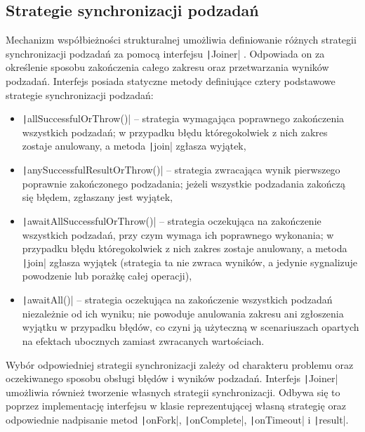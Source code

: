 \subsection{Strategie synchronizacji podzadań}
Mechanizm współbieżności strukturalnej umożliwia definiowanie różnych strategii synchronizacji podzadań za pomocą interfejsu \texttt|Joiner| \cite{java-structured-task-scope-joiner}. Odpowiada on za określenie sposobu zakończenia całego zakresu oraz przetwarzania wyników podzadań.
Interfejs posiada statyczne metody definiujące cztery podstawowe strategie synchronizacji podzadań:
\begin{itemize}
    \item \texttt|allSuccessfulOrThrow()| -- strategia wymagająca poprawnego zakończenia wszystkich podzadań; w przypadku błędu któregokolwiek z nich zakres zostaje anulowany, a metoda \texttt|join| zgłasza wyjątek,
    \item \texttt|anySuccessfulResultOrThrow()| -- strategia zwracająca wynik pierwszego poprawnie zakończonego podzadania; jeżeli wszystkie podzadania zakończą się błędem, zgłaszany jest wyjątek,
    \item \texttt|awaitAllSuccessfulOrThrow()| -- strategia oczekująca na zakończenie wszystkich podzadań, przy czym wymaga ich poprawnego wykonania; w przypadku błędu któregokolwiek z nich zakres zostaje anulowany, a metoda \texttt|join| zgłasza wyjątek (strategia ta nie zwraca wyników, a jedynie sygnalizuje powodzenie lub porażkę całej operacji),
    \item \texttt|awaitAll()| -- strategia oczekująca na zakończenie wszystkich podzadań niezależnie od ich wyniku; nie powoduje anulowania zakresu ani zgłoszenia wyjątku w przypadku błędów, co czyni ją użyteczną w scenariuszach opartych na efektach ubocznych zamiast zwracanych wartościach.
\end{itemize}
Wybór odpowiedniej strategii synchronizacji zależy od charakteru problemu oraz oczekiwanego sposobu obsługi błędów i wyników podzadań. Interfejs \texttt|Joiner| umożliwia również tworzenie własnych strategii synchronizacji. Odbywa się to poprzez implementację interfejsu w klasie reprezentującej własną strategię oraz odpowiednie nadpisanie metod \texttt|onFork|, \texttt|onComplete|, \texttt|onTimeout| i \texttt|result|. \cite{jep525, java-structured-task-scope-joiner}


